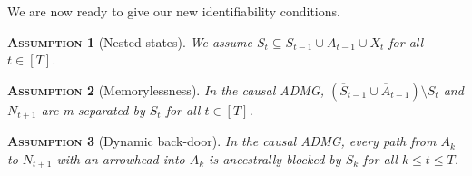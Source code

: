 \documentclass[12pt,a4paper]{article}
\newtheorem{assumption}{\normalfont\scshape Assumption}
\theoremstyle{definition}
\newcommand{\G}[0]{\mathcal{G}}
\newcommand{\ingraph}[1]{~\textnormal{\bf in}\,#1}
\newcommand{\textnot}{\textnormal{\bf not}~}
\DeclareMathOperator{\gG}{\mathscr{G}}
\begin{document}
We are now
ready to give our new identifiability conditions.
\begin{assumption}[Nested states] \label{assump:nested-states}
  We assume $S_t \subseteq S_{t-1} \cup A_{t-1} \cup X_t$  for all $t \in [T]$.
\end{assumption}

\begin{assumption}[Memorylessness] \label{assump:memorylessness}
  In the causal ADMG, $(\overline{S}_{t-1} \cup \overline{A}_{t-1}) \setminus
  S_t$ and $N_{t+1}$ are m-separated by $S_t$ for all $t \in [T]$.
\end{assumption}


\begin{assumption}[Dynamic back-door] \label{assump:no-confounding-a}
  In the causal ADMG, every path from $A_k$ to $N_{t+1}$ with an
  arrowhead into $A_k$ is ancestrally blocked by $S_k$ for all $k \leq
  t \leq T$.
\end{assumption}
\end{document}
